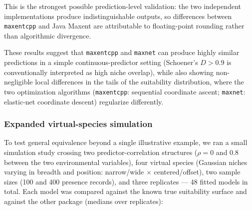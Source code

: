 \documentclass[10pt,letterpaper]{article}
\begin{document}
This is the strongest possible prediction-level validation: the two
independent implementations produce indistinguishable outputs, so
differences between \texttt{maxentcpp} and Java Maxent are attributable
to floating-point rounding rather than algorithmic divergence.

These results suggest that \texttt{maxentcpp} and \texttt{maxnet} can
produce highly similar predictions in a simple continuous-predictor
setting (Schoener's \(D > 0.9\) is conventionally interpreted as high
niche overlap), while also showing non-negligible local differences in
the tails of the suitability distribution, where the two optimization
algorithms (\texttt{maxentcpp}: sequential coordinate ascent;
\texttt{maxnet}: elastic-net coordinate descent) regularize differently.

\subsubsection*{Expanded virtual-species
simulation}

To test general equivalence beyond a single illustrative example, we ran a small simulation study crossing two predictor-correlation structures (\(\rho = 0\) and \(0.8\) between the two environmental variables), four virtual species (Gaussian niches varying in breadth and position:
narrow/wide \(\times\) centered/offset), two sample sizes (100 and 400
presence records), and three replicates --- 48 fitted models in total.
Each model was compared against the known true suitability surface and
against the other package (medians over replicates):
\end{document}

